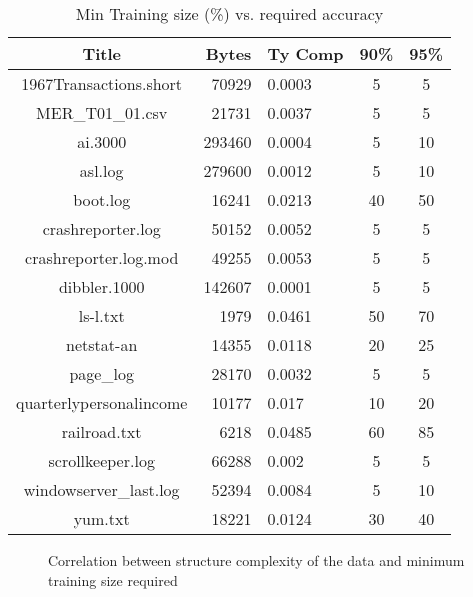 \begin{table}
\begin{center}
\begin{tabular}{|c|r|l|c|c|} \hline
Title 			& Bytes 	& Ty Comp	& 90\% 		& 95\% \\ \hline \hline
1967Transactions.short	& 70929		& 0.0003	& 5		& 5 			\\ \hline
MER\_T01\_01.csv        & 21731 	& 0.0037	& 5		& 5\\ \hline
ai.3000                 & 293460 	& 0.0004	& 5		& 10\\ \hline
asl.log                 & 279600	& 0.0012	& 5		& 10\\ \hline
boot.log                & 16241		& 0.0213	& 40		& 50\\ \hline
crashreporter.log       & 50152 	& 0.0052	& 5		& 5\\ \hline
crashreporter.log.mod   & 49255		& 0.0053	& 5		& 5\\ \hline
dibbler.1000            & 142607 	& 0.0001	& 5		& 5\\ \hline
ls-l.txt                & 1979		& 0.0461	& 50		& 70\\ \hline
netstat-an              & 14355		& 0.0118	& 20		& 25\\ \hline
page\_log               & 28170		& 0.0032	& 5		& 5\\ \hline
quarterlypersonalincome & 10177		& 0.017		& 10		& 20\\ \hline
railroad.txt            & 6218		& 0.0485	& 60		& 85\\ \hline
scrollkeeper.log        & 66288		& 0.002		& 5		& 5\\ \hline
windowserver\_last.log  & 52394		& 0.0084	& 5		& 10\\ \hline
yum.txt                 & 18221		& 0.0124	& 30		& 40\\ \hline
\end{tabular}
\caption{Min Training size (\%) vs. required accuracy}
\end{center}
\end{table}

\begin{figure}
\begin{center}
\caption{Correlation between structure complexity of 
the data and minimum training size required}
\end{center}
\end{figure}
